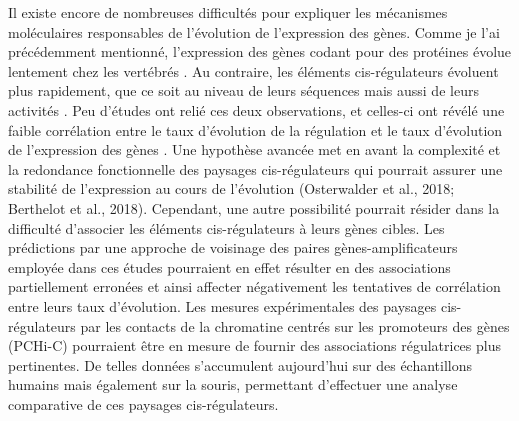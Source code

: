 \newpage

Il existe encore de nombreuses difficultés pour expliquer les mécanismes moléculaires responsables de l’évolution de l’expression des gènes. Comme je l’ai précédemment mentionné, l'expression des gènes codant pour des protéines évolue lentement chez les vertébrés \citep{brawand_evolution_2011, necsulea_evolutionary_2014, cardoso-moreira_gene_2019}. Au contraire, les éléments cis-régulateurs évoluent plus rapidement, que ce soit au niveau de leurs séquences mais aussi de leurs activités \citep{cheng_principles_2014, villar_enhancer_2015}. Peu d’études ont relié ces deux observations, et celles-ci ont révélé une faible corrélation entre le taux d’évolution de la régulation et le taux d’évolution de l’expression des gènes \citep{wong_interplay_2017, berthelot_complexity_2018}. Une hypothèse avancée met en avant la complexité et la redondance fonctionnelle des paysages cis-régulateurs qui pourrait assurer une stabilité de l’expression au cours de l’évolution \citep{oster}(Osterwalder et al., 2018; Berthelot et al., 2018). Cependant, une autre possibilité pourrait résider dans la difficulté d’associer les éléments cis-régulateurs à leurs gènes cibles. Les prédictions par une approche de voisinage des paires gènes-amplificateurs employée dans ces études pourraient en effet résulter en des associations partiellement erronées et ainsi affecter négativement les tentatives de corrélation entre leurs taux d’évolution. Les mesures expérimentales des paysages cis-régulateurs par les contacts de la chromatine centrés sur les promoteurs des gènes (PCHi-C) pourraient être en mesure de fournir des associations régulatrices plus pertinentes. De telles données s’accumulent aujourd’hui sur des échantillons humains mais également sur la souris, permettant d’effectuer une analyse comparative de ces paysages cis-régulateurs.\\

